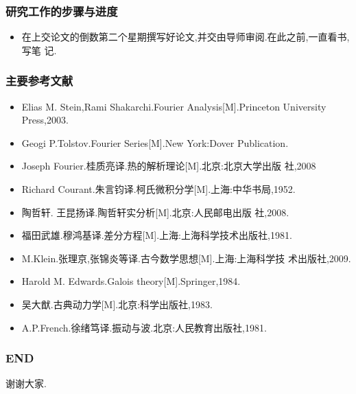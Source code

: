 \documentclass{beamer}
\begin{document}
\begin{frame}
  \frametitle{研究工作的步骤与进度}
  \begin{itemize}
  \item 在上交论文的倒数第二个星期撰写好论文,并交由导师审阅.在此之前,一直看书,写笔
    记.
  \end{itemize}
\end{frame}
\begin{frame}
  \frametitle{主要参考文献}
  \begin{itemize}
\item  Elias M. Stein,Rami Shakarchi.Fourier Analysis[M].Princeton
  University Press,2003.
\item Geogi P.Tolstov.Fourier Series[M].New York:Dover Publication.
\item Joseph Fourier.桂质亮译.热的解析理论[M].北京:北京大学出版
  社,2008
\item Richard Courant.朱言钧译.柯氏微积分学[M].上海:中华书局,1952.
\item  陶哲轩. 王昆扬译.陶哲轩实分析[M].北京:人民邮电出版
    社,2008.
\item 福田武雄.穆鸿基译.差分方程[M].上海:上海科学技术出版社,1981.
\item M.Klein.张理京,张锦炎等译.古今数学思想[M].上海:上海科学技
  术出版社,2009.
\item Harold M. Edwards.Galois theory[M].Springer,1984.
\item 吴大猷.古典动力学[M].北京:科学出版社,1983.
\item A.P.French.徐绪笃译.振动与波.北京:人民教育出版社,1981.
  \end{itemize}
\end{frame}
\begin{frame}
  \frametitle{END}
\begin{center}
谢谢大家.
\end{center}
\end{frame}
\end{document}
